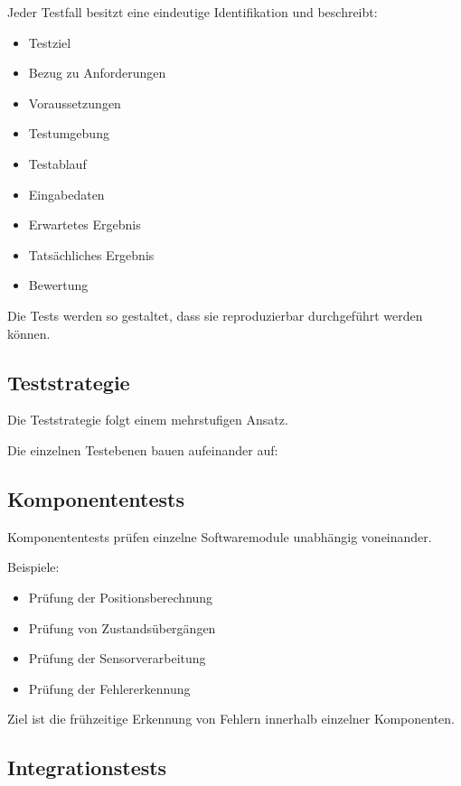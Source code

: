 \documentclass[
  a4paper,
  12pt,
  DIV=12,        %
  parskip=half,  %
  headings=small %
]{scrartcl}
\theoremstyle{definition}
\providecommand{\tightlist}{%
  \setlength{\itemsep}{0pt}\setlength{\parskip}{0pt}}
\theoremstyle{definition}
\begin{document}
Jeder Testfall besitzt eine eindeutige Identifikation und beschreibt:

\begin{itemize}
\tightlist
\item
  Testziel
\item
  Bezug zu Anforderungen
\item
  Voraussetzungen
\item
  Testumgebung
\item
  Testablauf
\item
  Eingabedaten
\item
  Erwartetes Ergebnis
\item
  Tatsächliches Ergebnis
\item
  Bewertung
\end{itemize}

Die Tests werden so gestaltet, dass sie reproduzierbar durchgeführt
werden können.

\subsection{Teststrategie}\label{teststrategie}

Die Teststrategie folgt einem mehrstufigen Ansatz.

Die einzelnen Testebenen bauen aufeinander auf:

\subsection{Komponententests}\label{komponententests}

Komponententests prüfen einzelne Softwaremodule unabhängig voneinander.

Beispiele:

\begin{itemize}
\tightlist
\item
  Prüfung der Positionsberechnung
\item
  Prüfung von Zustandsübergängen
\item
  Prüfung der Sensorverarbeitung
\item
  Prüfung der Fehlererkennung
\end{itemize}

Ziel ist die frühzeitige Erkennung von Fehlern innerhalb einzelner
Komponenten.

\subsection{Integrationstests}\label{integrationstests}
\end{document}
